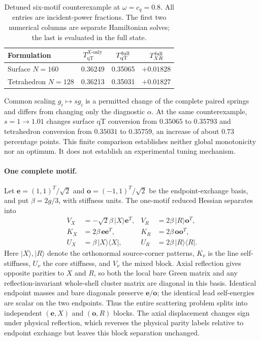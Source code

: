 \documentclass[10pt,aps,onecolumn,notitlepage,nofootinbib]{revtex4-2}
\newcommand{\qT}{\mathrm{qT}}
\begin{document}
\begin{table}[htbp]
\caption{Detuned six-motif counterexample at $\omega=c_q=0.8$. All entries are incident-power fractions. The first two numerical columns are separate Hamiltonian solves; the last is evaluated in the full state.}
\label{tab:sm-pred-detuning}
\centering
\begin{ruledtabular}
\begin{tabular}{lccc}
Formulation & $T_{\qT}^{X\text{-only}}$ & $T_{\qT}^{\rm full}$ & $T_{XR}^{\rm full}$\\
\hline
Surface $N=160$ & 0.36249 & 0.35065 & $+0.01828$\\
Tetrahedron $N=128$ & 0.36213 & 0.35031 & $+0.01827$\\
\end{tabular}
\end{ruledtabular}
\end{table}

Common scaling $g_i\mapsto s g_i$ is a permitted change of the complete paired springs and differs from changing only the diagnostic $\alpha$. At the same counterexample, $s=1\to1.01$ changes surface qT conversion from $0.35065$ to $0.35793$ and tetrahedron conversion from $0.35031$ to $0.35759$, an increase of about $0.73$ percentage points. This finite comparison establishes neither global monotonicity nor an optimum. It does not establish an experimental tuning mechanism.

\paragraph*{One complete motif.}
Let $\bm e=(1,1)^T/\sqrt2$ and $\bm o=(-1,1)^T/\sqrt2$ be the endpoint-exchange basis, and put $\beta=2g/3$, with stiffness units. The one-motif reduced Hessian separates into
\begin{align}
 V_X&=-\sqrt2\beta\,|X\rangle\bm e^T,
 &V_R&=2\beta\,|R\rangle\bm o^T,\\
 K_X&=2\beta\,\bm e\bm e^T,
 &K_R&=2\beta\,\bm o\bm o^T,\\
 U_X&=\beta\,|X\rangle\langle X|,
 &U_R&=2\beta\,|R\rangle\langle R|.
 \label{eq:sm-pred-one-motif-blocks}
\end{align}
Here $|X\rangle,|R\rangle$ denote the orthonormal source-corner patterns, $K_\nu$ is the line self-stiffness, $U_\nu$ the core stiffness, and $V_\nu$ the mixed block. Axial reflection gives opposite parities to $X$ and $R$, so both the local bare Green matrix and any reflection-invariant whole-shell cluster matrix are diagonal in this basis. Identical endpoint masses and bare diagonals preserve $\bm e/\bm o$; the identical lead self-energies are scalar on the two endpoints. Thus the entire scattering problem splits into independent $(\bm e,X)$ and $(\bm o,R)$ blocks. The axial displacement changes sign under physical reflection, which reverses the physical parity labels relative to endpoint exchange but leaves this block separation unchanged.
\end{document}
